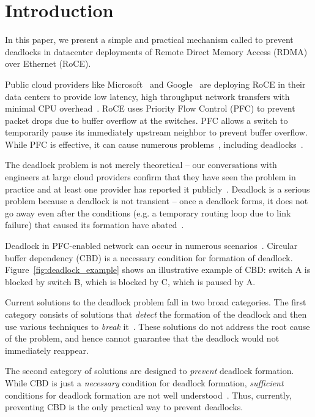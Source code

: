 \section{Introduction}
\label{sec:intro}

In this paper, we present a simple and practical mechanism called \sysname{} to
prevent deadlocks in datacenter deployments of Remote Direct Memory Access
(RDMA) over Ethernet (RoCE).

Public cloud providers like Microsoft~\cite{dcqcn} and Google~\cite{timely} are
deploying RoCE in their data centers to provide low latency, high throughput
network transfers with minimal CPU overhead~\cite{dcqcn}.  RoCE uses Priority
Flow Control (PFC) to prevent packet drops due to buffer overflow at the
switches. PFC allows a switch to temporarily pause its immediately upstream
neighbor to prevent buffer overflow. While PFC is effective, it can cause
numerous problems~\cite{dcqcn}, including
deadlocks~\cite{rdmaatscale,tcp-bolt,hu2016deadlocks}.

The deadlock problem is not merely theoretical -- our conversations with
engineers at large cloud providers confirm that they have seen the problem in
practice and at least one provider has reported it publicly~\cite{rdmaatscale}.
Deadlock is a serious problem because a deadlock is not transient -- once a
deadlock forms, it does not go away even after the conditions (e.g. a temporary
routing loop due to link failure) that caused its formation have
abated~\cite{rdmaatscale}.

Deadlock in PFC-enabled network can occur in numerous
scenarios~\cite{hu2016deadlocks}. Circular buffer dependency (CBD) is a
necessary condition for formation of deadlock.
Figure~\ref{fig:deadlock_example} shows an illustrative example of CBD: switch A
is blocked by switch B, which is blocked by C, which is paused by A. 

Current solutions to the deadlock problem fall in two broad categories. The
first category consists of solutions that {\em detect} the formation of the
deadlock and then use various techniques to {\em break}
it~\cite{shpiner2016unlocking}.  These solutions do not address the root cause
of the problem, and hence cannot guarantee that the deadlock would not
immediately reappear. 

The second category of solutions are designed to {\em prevent} deadlock
formation. While CBD is just a {\em necessary} condition for deadlock formation,
{\em sufficient} conditions for deadlock formation are not well
understood~\cite{hu2016deadlocks}. Thus, currently, preventing CBD is the only
practical way to prevent deadlocks. 


